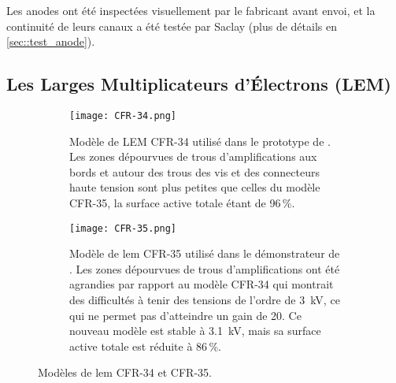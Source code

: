       Les anodes ont été inspectées visuellement par le fabricant avant envoi, et la continuité de leurs canaux a été testée par Saclay (plus de détails en \autoref{sec::test_anode}).
        
    \subsection{Les Larges Multiplicateurs d'Électrons (LEM)}\label{sec::LEM}

      \begin{figure}[!htb]
        \begin{subfigure}[t]{0.48\textwidth}
          \centering
          \captionsetup{width=.95\linewidth}
          \texttt{[image: CFR-34.png]}
          \caption{\label{fig::cfr34}Modèle de LEM CFR-34 utilisé dans le prototype de \TOO{}. Les zones dépourvues de trous d'amplifications aux bords et autour des trous des vis et des connecteurs haute tension sont plus petites que celles du modèle CFR-35, la surface active totale étant de 96\,\%.}
        \end{subfigure}
        \hfill
        \begin{subfigure}[t]{0.48\textwidth}
          \centering
          \captionsetup{width=.95\linewidth}
          \texttt{[image: CFR-35.png]}
          \caption{\label{fig::cfr35}Modèle de \gls{lem} CFR-35 utilisé dans le démonstrateur de \SSS{}. Les zones dépourvues de trous d'amplifications ont été agrandies par rapport au modèle CFR-34 qui montrait des difficultés à tenir des tensions de l'ordre de \SI{3}{\kilo\volt}, ce qui ne permet pas d'atteindre un gain de 20. Ce nouveau modèle est stable à \SI{3.1}{\kilo\volt}, mais sa surface active totale est réduite à 86\,\%.}
        \end{subfigure}
        \caption[Modèle de LEM CFR-34 et CFR-35]{Modèles de \gls{lem} CFR-34 et CFR-35.}
        \label{fig::cfrs}
      \end{figure}

            
